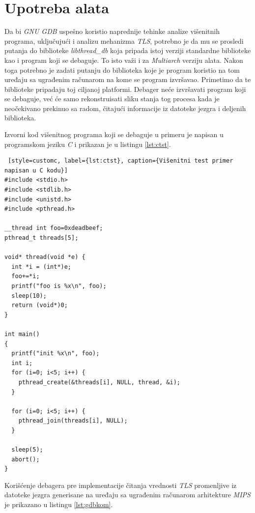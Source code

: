 \documentclass[12pt,oneside]{memoir}
\begin{document}
\section{Upotreba alata}

Da bi \emph{GNU GDB} uspešno koristio naprednije tehinke analize višenitnih programa, uključujući i analizu mehanizma \emph{TLS}, potrebno je da mu se prosledi putanja do biblioteke \emph{libthread\_db} koja pripada istoj verziji standardne biblioteke kao i program koji se debaguje. To isto važi i za \emph{Multiarch} verziju alata. Nakon toga potrebno je zadati putanju do biblioteka koje je program koristio na tom uređaju sa ugrađenim računarom na kome se program izvršavao. Primetimo da te biblioteke pripadaju toj ciljanoj platformi. Debager neće izvršavati program koji se debaguje, već će samo rekonstruisati sliku stanja tog procesa kada je neočekivano prekinuo sa radom, čitajući informacije iz datoteke jezgra i deljenih biblioteka.


Izvorni kod višenitnog programa koji se debaguje u primeru je napisan u programskom jeziku \emph{C} i prikazan je u listingu \ref{lst:ctst}.\newpage

\begin{lstlisting} [style=customc, label={lst:ctst}, caption={Višenitni test primer napisan u C kodu}]
#include <stdio.h>
#include <stdlib.h>
#include <unistd.h>
#include <pthread.h>

__thread int foo=0xdeadbeef;
pthread_t threads[5];

void* thread(void *e) {
  int *i = (int*)e;
  foo+=*i;
  printf("foo is %x\n", foo);
  sleep(10);
  return (void*)0;
}   

int main()
{
  printf("init %x\n", foo);
  int i;
  for (i=0; i<5; i++) {
    pthread_create(&threads[i], NULL, thread, &i);
  }

  for (i=0; i<5; i++) {
    pthread_join(threads[i], NULL);
  }

  sleep(5);
  abort();
}

\end{lstlisting}

Korišćenje debagera pre implementacije čitanja vrednosti \emph{TLS} promenljive iz datoteke jezgra generisane na uređaju sa ugrađenim računarom arhitekture \emph{MIPS} je prikazano u listingu \ref{lst:gdbkom}.\newpage
\end{document}
